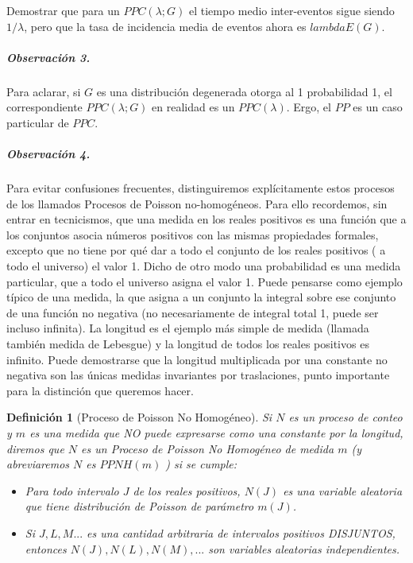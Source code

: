 \documentclass[
  oneside]{article}
\newtheorem{definition}{Definición}[section]
\begin{document}
Demostrar que para un \(PPC(\lambda;G)\) el tiempo medio inter-eventos
sigue siendo \(1/\lambda\), pero que la tasa de incidencia media de
eventos ahora es \(lambda E(G)\).

\hypertarget{observaciuxf3n-3.}{%
\subparagraph{Observación 3.}\label{observaciuxf3n-3.}}

Para aclarar, si \(G\) es una distribución degenerada otorga al 1
probabilidad 1, el correspondiente \(PPC(\lambda;G)\) en realidad es un
\(PPC(\lambda)\). Ergo, el \(PP\) es un caso particular de \(PPC\).

\hypertarget{observaciuxf3n-4.}{%
\subparagraph{Observación 4.}\label{observaciuxf3n-4.}}

Para evitar confusiones frecuentes, distinguiremos explícitamente estos
procesos de los llamados Procesos de Poisson no-homogéneos. Para ello
recordemos, sin entrar en tecnicismos, que una medida en los reales
positivos es una función que a los conjuntos asocia números positivos
con las mismas propiedades formales, excepto que no tiene por qué dar a
todo el conjunto de los reales positivos ( a todo el universo) el valor
1. Dicho de otro modo una probabilidad es una medida particular, que a
todo el universo asigna el valor 1. Puede pensarse como ejemplo típico
de una medida, la que asigna a un conjunto la integral sobre ese
conjunto de una función no negativa (no necesariamente de integral total
1, puede ser incluso infinita). La longitud es el ejemplo más simple de
medida (llamada también medida de Lebesgue) y la longitud de todos los
reales positivos es infinito. Puede demostrarse que la longitud
multiplicada por una constante no negativa son las únicas medidas
invariantes por traslaciones, punto importante para la distinción que
queremos hacer.

\begin{definition}[Proceso de Poisson No Homogéneo]\label{def:3}
Si $N$ es un proceso de conteo y $m$ es una medida que NO puede expresarse como una constante por la longitud, diremos que $N$ es un Proceso de Poisson No Homogéneo de medida $m$ (y abreviaremos $N$ es $PPNH(m)$ ) si se cumple:

\begin{itemize}
\item[a)] Para todo intervalo $J$ de los reales positivos, $N(J)$ es una variable aleatoria que tiene distribución de Poisson de parámetro $m(J)$.
\item[b)] Si $J, L, M...$ es una cantidad arbitraria de intervalos positivos DISJUNTOS, entonces $N(J), N(L), N(M),...$ son variables aleatorias independientes.
\end{itemize}
\end{definition}
\end{document}
